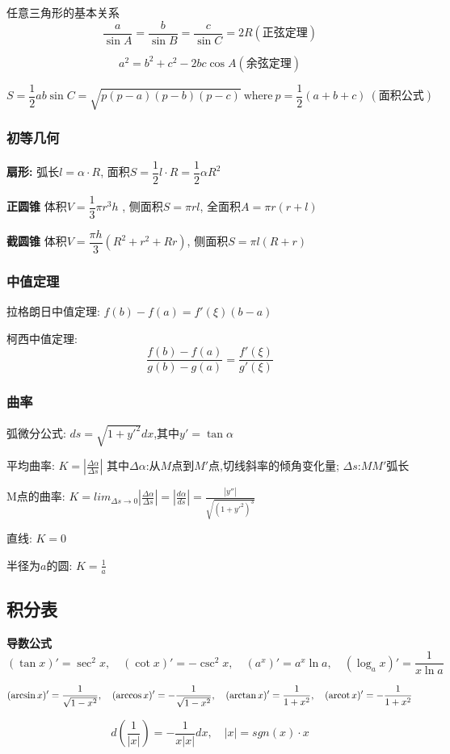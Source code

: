 \documentclass{article}
\begin{document}
任意三角形的基本关系
$$
\frac{a}{\sin A}=
\frac{b}{\sin B}=
\frac{c}{\sin C}=
2R(\mbox{正弦定理})
$$

$$
a^2=b^2+c^2-2bc\cos A (\mbox{余弦定理})
$$

$$
S= \frac{ 1}{2}ab\sin C=\sqrt{p(p-a)(p-b)(p-c)}~\mbox{where}~p=\frac{1}{2}(a+b+c)~ (\mbox{面积公式})
$$

\subsubsection{初等几何}
\textbf{扇形:}
弧长$l=\alpha \cdot R$, \quad
面积$S=\dfrac{1}{2}l\cdot R=\dfrac{1}{2}\alpha R^2$

\textbf{正圆锥}
体积$V=\dfrac{1}{3}\pi r^3 h$ , \quad
侧面积$S=\pi rl$, \quad
全面积$A=\pi r(r+l)$

\textbf{截圆锥}
体积$V=\dfrac{\pi h}{3}(R^2+r^2+Rr)$, \quad
侧面积$S=\pi l(R+r)$

\subsubsection{中值定理}
拉格朗日中值定理: $f(b)-f(a)=f'(\xi)(b-a)$

柯西中值定理: $$\frac{f(b)-f(a)}{g(b)-g(a)}=\frac{f'(\xi) }{g'(\xi)}$$
\subsubsection{曲率}
弧微分公式: $ds=\sqrt{1+y'^2}dx$,其中$y'=\tan \alpha$

平均曲率: $K=|\frac{\Delta\alpha}{\Delta s}|$ 其中$\Delta \alpha$:从$M$点到$M'$点,切线斜率的倾角变化量; $\Delta s$:$MM'$弧长

M点的曲率: $K=lim_{\Delta s \to 0}|\frac{\Delta\alpha}{\Delta s}|=|\frac{d \alpha}{ds}|=\frac{|y''|}{\sqrt{(1+y'^2)^3}}$

直线: $K=0$

半径为$a$的圆: $K=\frac{1}{a}$

\subsection{积分表}
\textbf{导数公式}
$$
(\tan x)'=\sec ^2 x,\quad
(\cot x)'=-\csc^2 x,\quad
(a^x)'=a^x\ln a,\quad
(\log_a x)'=\frac{1}{x \ln a}
$$

$$
(\arcsin x)'=\frac{1}{\sqrt{1-x^2}}, \quad
(\arccos x)'=-\frac{1}{\sqrt{1-x^2}}, \quad
(\arctan x)'=\frac{1}{1+x^2}, \quad
(\operatorname{arcot} x)'=-\frac{1}{1+x^2}
$$

$$
d(\frac{1}{|x|})=-\frac{1}{x|x|}dx, \quad |x|=sgn(x)\cdot x
$$
\end{document}
